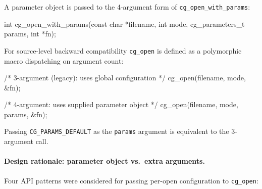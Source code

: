 \documentclass[11pt,letterpaper]{article}
\makeatletter
\let\cgns@orig@lstlisting\lstlisting
\let\cgns@endorig@lstlisting\endlstlisting
\renewenvironment{lstlisting}
  {\par\needspace{5\baselineskip}\nolinenumbers\cgns@orig@lstlisting}
  {\cgns@endorig@lstlisting\par\linenumbers}
\makeatother
\begin{document}
A parameter object is passed to the 4-argument form of
\texttt{cg\_open\_with\_params}:

\begin{lstlisting}[language=C]
int cg_open_with_params(const char     *filename,
                        int             mode,
                        cg_parameters_t params,
                        int            *fn);
\end{lstlisting}

For source-level backward compatibility \texttt{cg\_open} is defined
as a polymorphic macro dispatching on argument count:

\begin{lstlisting}[language=C]
/* 3-argument (legacy): uses global configuration */
cg_open(filename, mode, &fn);

/* 4-argument: uses supplied parameter object */
cg_open(filename, mode, params, &fn);
\end{lstlisting}

Passing \texttt{CG\_PARAMS\_DEFAULT} as the \texttt{params} argument
is equivalent to the 3-argument call.

\paragraph{Design rationale: parameter object vs.\ extra arguments.}
Four API patterns were considered for passing per-open configuration
to \texttt{cg\_open}:
\end{document}
